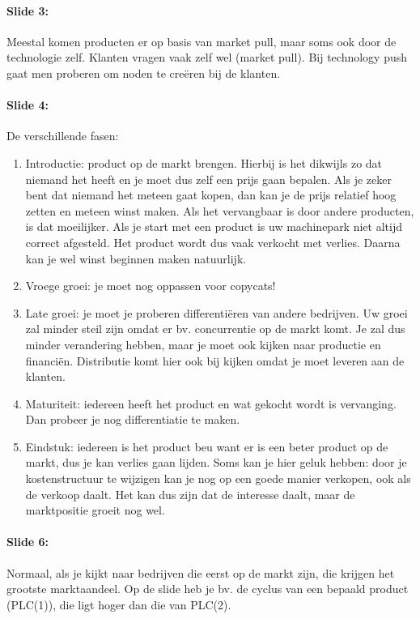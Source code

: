 \documentclass[10pt,a4paper]{report}
\begin{document}
\paragraph{Slide 3:} Meestal komen producten er op basis van market pull, maar soms ook door de technologie zelf. Klanten vragen vaak zelf wel (market pull). Bij technology push gaat men proberen om noden te cre\"eren bij de klanten.

\paragraph{Slide 4:} De verschillende fasen: 
\begin{enumerate}
\item Introductie: product op de markt brengen. Hierbij is het dikwijls zo dat niemand het heeft en je moet dus zelf een prijs gaan bepalen. Als je zeker bent dat niemand het meteen gaat kopen, dan kan je de prijs relatief hoog zetten en meteen winst maken. Als het vervangbaar is door andere producten, is dat moeilijker. Als je start met een product is uw machinepark niet altijd correct afgesteld. Het product wordt dus vaak verkocht met verlies. Daarna kan je wel winst beginnen maken natuurlijk. 
\item Vroege groei: je moet nog oppassen voor copycats! 
\item Late groei: je moet je proberen differenti\"eren van andere bedrijven. Uw groei zal minder steil zijn omdat er bv. concurrentie op de markt komt. Je zal dus minder verandering hebben, maar je moet ook kijken naar productie en financi\"en. Distributie komt hier ook bij kijken omdat je moet leveren aan de klanten.
\item Maturiteit: iedereen heeft het product en wat gekocht wordt is vervanging. Dan probeer je nog differentiatie te maken.
\item Eindstuk: iedereen is het product beu want er is een beter product op de markt, dus je kan verlies gaan lijden. Soms kan je hier geluk hebben: door je kostenstructuur te wijzigen kan je nog op een goede manier verkopen, ook als de verkoop daalt. Het kan dus zijn dat de interesse daalt, maar de marktpositie groeit nog wel.
\end{enumerate}

\paragraph{Slide 6:} Normaal, als je kijkt naar bedrijven die eerst op de markt zijn, die krijgen het grootste marktaandeel. Op de slide heb je bv. de cyclus van een bepaald product (PLC(1)), die ligt hoger dan die van PLC(2). 
\end{document}
